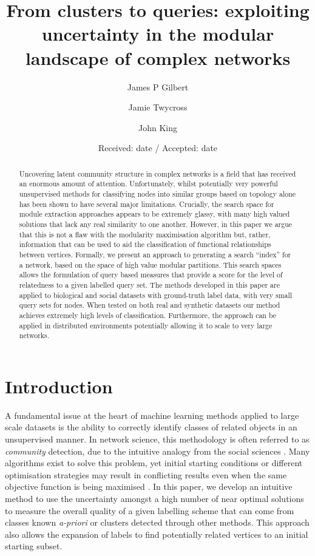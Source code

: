 \documentclass[a4paper,10pt]{article}
\begin{document}
\title{From clusters to queries: exploiting uncertainty in the modular landscape of complex networks}


\author{James P Gilbert         \and
	Jamie Twycross 		\and
	John King
	}
\date{Received: date / Accepted: date}


\maketitle

\begin{abstract}
Uncovering latent community structure in complex networks is a field that has received an enormous amount of attention.
Unfortunately, whilst potentially very powerful unsupervised methods for classifying nodes into similar groups based on topology alone has been shown to have several major limitations.
Crucially, the search space for module extraction approaches appears to be extremely glassy, with many high valued solutions that lack any real similarity to one another.
However, in this paper we argue that this is not a flaw with the modularity maximisation algorithm but, rather, information that can be used to aid the classification of functional relationships between vertices.
Formally, we present an approach to generating a search ``index'' for a network, based on the space of high value modular partitions.
This search spaces allows the formulation of query based measures that provide a score for the level of relatedness to a given labelled query set.
The methods developed in this paper are applied to biological and social datasets with ground-truth label data, with very small query sets for nodes.
When tested on both real and synthetic datasets our method achieves extremely high levels of classification.
Furthermore, the approach can be applied in distributed environments potentially allowing it to scale to very large networks.
\end{abstract}

\section{Introduction}

A fundamental issue at the heart of machine learning methods applied to large scale datasets is the ability to correctly identify classes of related objects in an unsupervised manner.
In network science, this methodology is often referred to as \textit{community} detection, due to the intuitive analogy from the social sciences \cite{fortunato2010community}.
Many algorithms exist to solve this problem, yet initial starting conditions or different optimisation strategies may result in conflicting results even when the same objective function is being maximised \cite{good2010performance}.
In this paper, we develop an intuitive method to use the uncertainty amongst a high number of near optimal solutions to measure the overall quality of a given labelling scheme that can come from classes known \textit{a-priori} or clusters detected through other methods.
This approach also allows the expansion of labels to find potentially related vertices to an initial starting subset.
\end{document}
